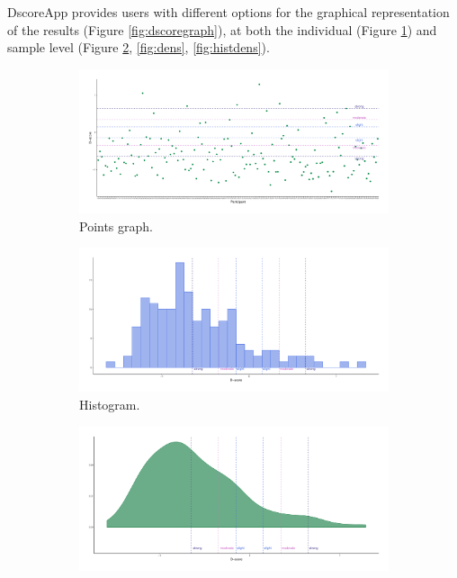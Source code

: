 \documentclass[12pt]{book}
\begin{document}
DscoreApp provides users with different options for the graphical representation of the results (Figure \ref{fig:dscoregraph}), at both the individual (Figure \ref{fig:point}) and sample level (Figure \ref{fig:hist}, \ref{fig:dens}, \ref{fig:histdens}). 
%
\begin{figure}[h!]
	\centering 
	\begin{subfigure}{0.4\linewidth}
		\includegraphics[width=\linewidth]{PointDefaultDscore3.pdf}
		\caption{Points graph.}
		\label{fig:point}
	\end{subfigure}
	\begin{subfigure}{0.4\linewidth}
		\includegraphics[width=\linewidth]{HistogramDscore3.pdf}
		\caption{Histogram.}
		\label{fig:hist}
	\end{subfigure}
	\begin{subfigure}{0.4\linewidth}
		\includegraphics[width=\linewidth]{DensityDscore3.pdf}

\end{subfigure}
\end{figure}
\end{document}
